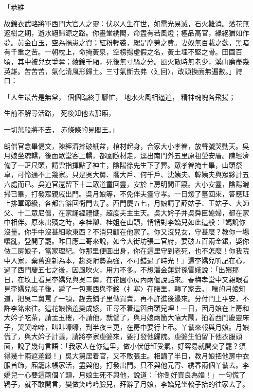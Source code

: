 「恭維

故錦衣武略將軍西門大官人之靈：伏以人生在世，如電光易滅，石火難消。落花無返樹之期，逝水絕歸源之路。你畫堂綉閣，命盡有若風燈；極品高官，緣絕猶如作夢。黃金白玉，空為禍患之資；紅粉輕裘，總是塵勞之費。妻奴無百載之歡，黑暗有千重之苦。一朝枕上，命掩黃泉，空榜揚虛假之名，黃土埋不堅之骨。田園百頃，其中被兒女爭奪；綾錦千廂，死後無寸絲之分。風火散時無老少，溪山磨盡幾英雄。苦苦苦，氣化清風形歸土。三寸氣斷去弗〈廴回〉，改頭換面無遍數。」詩曰：

「人生最苦是無常，  個個臨終手腳忙，     地水火風相逼迫，  精神魂魄各飛揚；

生前不解尋活路，  死後知他去那廂，

一切萬般將不去，  赤條條的見閻王。」

朗僧官念畢偈文，陳經濟摔破紙盆，棺材起身，合家大小孝眷，放聲號哭動天。吳月娘坐魂轎，後面眾堂客上轎，都圍隨材走，逕出南門外五里原祖塋安厝。陳經濟備了一疋尺頭，請雲指揮點了神主，陰陽徐先生下了葬。眾孝眷掩土畢，山頭祭卓，可怜通不上幾家。只是吳大舅、喬大戶、何千戶、沈姨夫、韓姨夫與眾夥計五六處而已。吳道官還留下十二眾道童回靈，安於上房明間正寢。大小安靈，陰陽灑掃已畢，打發眾親戚出門。吳月娘等，不免伴夫靈守孝。一日煖了墓回來，答應班上排軍節級，各都告辭回衙門去了。西門慶五七，月娘請了薛姑子、王姑子、大師父、十二眾尼僧，在家誦經禮懺，超度夫主生天。吳大妗子并吳舜臣媳婦，都在家中相伴。原來出殯之時，李桂卿、桂姐在山頭，悄悄對李嬌兒如此這般：「媽說你沒量。你手中沒甚細軟東西？不消只顧在他家了。你又沒兒女，守甚麼？教你一場嚷亂，登開了罷。昨日應二哥來說，如今大街坊張二官府，要破五百兩金銀，娶你做二房娘子，當家理紀。你那里便圖出身，你在這里守到老死，也不怎麼！你我院中人家，棄舊迎新為本，趨炎附勢為強，不可錯過了時光！」這李嬌兒听記在心，過了西門慶五七之後，因風吹火，用力不多。不想潘金蓮對孫雪娥說：「出殯那日，在坟上看見李嬌兒與吳二舅，在花園小房內兩個說話來。春梅孝堂中又親眼看見李嬌兒帳子後，遞了一包東西與李銘〈扌塞〉在腰里，轉了家去。」嚷的月娘知道，把吳二舅罵了一頓，趕去鋪子里做買賣，再不許進後邊來。分付門上平安，不許李銘來往。這花娘惱羞變成怒，正尋不着這箇由頭兒哩！一日，因月娘在上房和大妗子吃茶，請孟玉樓，不請他，就惱了，與月娘兩箇大嚷大鬧，拍着西門慶靈床子，哭哭啼啼，叫叫嚎嚎，到半夜三更，在房中要行上弔。丫鬟來報與月娘。月娘慌了，與大妗子計議，請將李家虔婆來，要打發他歸院。虔婆生怕留下他衣服頭面，說了幾句言語：「我家人在你這里，做小伏低缸受氣，好容易就開交了罷？須得幾十兩遮羞錢！」吳大舅居着官，又不敢張主。相講了半日，教月娘把他房中衣服首飾，廂籠床帳家活，盡與他，打發出門。只不與他元宵、綉春兩個丫鬟去。李嬌兒一心要這兩個丫頭，月娘生死不與他，說道：「你倒好買良為娼！」一句慌了鴇子，就不敢開言，變做笑吟吟臉兒，拜辭了月娘，李嬌兒坐轎子抬的往家去了。


